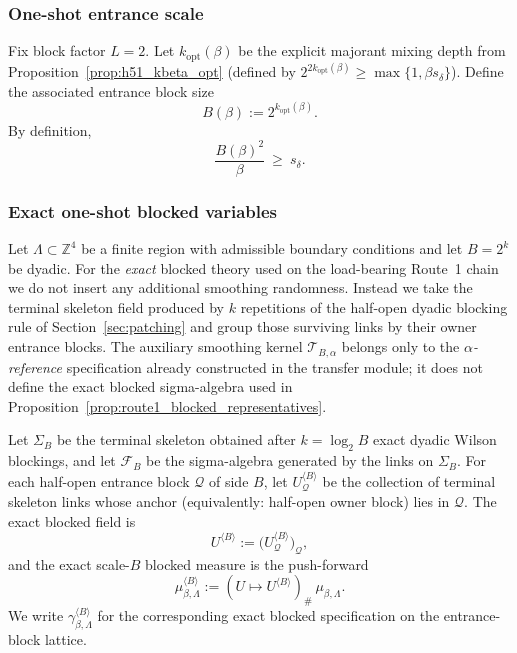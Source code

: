 \subsubsection{One-shot entrance scale}

Fix block factor $L=2$.
Let $k_{\mathrm{opt}}(\beta)$ be the explicit majorant mixing depth from Proposition~\ref{prop:h51_kbeta_opt}
(defined by $2^{2k_{\mathrm{opt}}(\beta)}\ge \max\{1,\beta s_{\delta}\}$).
Define the associated entrance block size
\begin{equation}
\label{eq:h60_Bbeta_def}
B(\beta):=2^{k_{\mathrm{opt}}(\beta)}.
\end{equation}
By definition,
\begin{equation}
\label{eq:h60_Bbeta_time}
\frac{B(\beta)^2}{\beta}\ \ge\ s_{\delta}.
\end{equation}

\subsubsection{Exact one-shot blocked variables}

Let $\Lambda\subset\mathbb Z^4$ be a finite region with admissible boundary conditions and let $B=2^k$ be dyadic.
For the \emph{exact} blocked theory used on the load-bearing Route~1 chain we do not insert any additional smoothing randomness.
Instead we take the terminal skeleton field produced by $k$ repetitions of the half-open dyadic blocking rule of Section~\ref{sec:patching} and group those surviving links by their owner entrance blocks.
The auxiliary smoothing kernel $\mathcal T_{B,\alpha}$ belongs only to the \emph{$\alpha$-reference} specification already constructed in the transfer module; it does not define the exact blocked sigma-algebra used in Proposition~\ref{prop:route1_blocked_representatives}.

\begin{definition}
\label{def:h60_one_shot_blocked_measure}
Let $\Sigma_B$ be the terminal skeleton obtained after $k=\log_2 B$ exact dyadic Wilson blockings, and let $\mathcal F_B$ be the sigma-algebra generated by the links on $\Sigma_B$.
For each half-open entrance block $\mathcal Q$ of side $B$, let $U^{\langle B\rangle}_{\mathcal Q}$ be the collection of terminal skeleton links whose anchor (equivalently: half-open owner block) lies in $\mathcal Q$.
The exact blocked field is
\[
U^{\langle B\rangle}:=\bigl(U^{\langle B\rangle}_{\mathcal Q}\bigr)_{\mathcal Q},
\]
and the exact scale-$B$ blocked measure is the push-forward
\begin{equation}
\label{eq:h60_one_shot_block_def}
\mu_{\beta,\Lambda}^{\langle B\rangle}
:=
(U\mapsto U^{\langle B\rangle})_\#\,\mu_{\beta,\Lambda}.
\end{equation}
We write $\gamma^{\langle B\rangle}_{\beta,\Lambda}$ for the corresponding exact blocked specification on the entrance-block lattice.
\end{definition}

